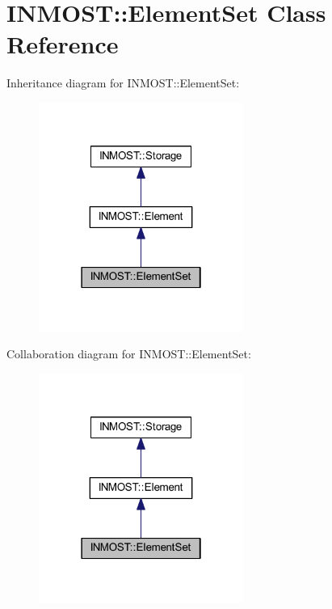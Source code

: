 \hypertarget{classINMOST_1_1ElementSet}{\section{I\-N\-M\-O\-S\-T\-:\-:Element\-Set Class Reference}
\label{classINMOST_1_1ElementSet}
}


Inheritance diagram for I\-N\-M\-O\-S\-T\-:\-:Element\-Set\-:
\nopagebreak
\begin{figure}[H]
\begin{center}
\leavevmode
\includegraphics[width=190pt]{classINMOST_1_1ElementSet__inherit__graph}
\end{center}
\end{figure}


Collaboration diagram for I\-N\-M\-O\-S\-T\-:\-:Element\-Set\-:
\nopagebreak
\begin{figure}[H]
\begin{center}
\leavevmode
\includegraphics[width=190pt]{classINMOST_1_1ElementSet__coll__graph}
\end{center}
\end{figure}
